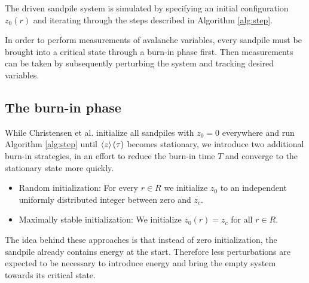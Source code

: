 The driven sandpile system is simulated by specifying an initial configuration $z_0(r)$ and iterating through the steps described in Algorithm \ref{alg:step}.

\begin{algorithm}
    \caption{Time evolution of a sandpile with a slow driving perturbation \cite{christensen1991dynamical}.}
    \label{alg:step}

\end{algorithm}

In order to perform measurements of avalanche variables, every sandpile must be brought into a critical state through a burn-in phase first. Then measurements can be taken by subsequently perturbing the system and tracking desired variables.

\subsection{The burn-in phase} \label{sec:burn-in}

While Christensen et al. initialize all sandpiles with $z_0=0$ everywhere and run Algorithm \ref{alg:step} until $\expval{z}(\tau)$ becomes stationary, we introduce two additional burn-in strategies, in an effort to reduce the burn-in time $T$ and converge to the stationary state more quickly.
\begin{itemize}
    \item Random initialization: For every $r\in R$ we initialize $z_0$ to an independent uniformly distributed integer between zero and $z_c$.
    \item Maximally stable initialization: We initialize $z_0(r) = z_c$ for all $r\in R$.
\end{itemize}
The idea behind these approaches is that instead of zero initialization, the sandpile already contains energy at the start. Therefore less perturbations are expected to be necessary to introduce energy and bring the empty system towards its critical state.

